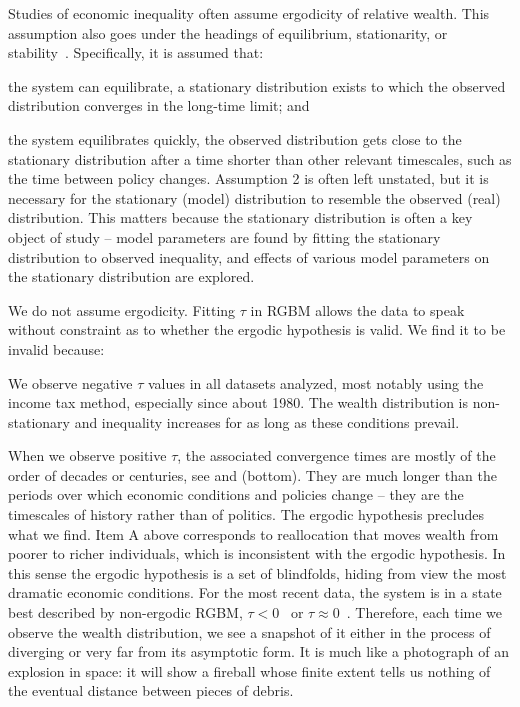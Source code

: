 Studies of economic inequality often assume ergodicity of relative wealth. This assumption also goes under the headings of equilibrium, stationarity, or stability~\cite{AdamouPeters2016}. Specifically, it is assumed that:
\bi
\item[1.] the system can equilibrate, \ie a stationary distribution exists to which the observed distribution converges in the long-time limit; and
\item[2.] the system equilibrates quickly, \ie the observed distribution gets close to the stationary distribution after a time shorter than other relevant timescales, such as the time between policy changes.
\ei
Assumption 2 is often left unstated, but it is necessary for the stationary (model) distribution to resemble the observed (real) distribution. This matters because the stationary distribution is often a key object of study -- model parameters are found by fitting the stationary distribution to observed inequality, and effects of various model parameters on the stationary distribution are explored.

We do not assume ergodicity. Fitting $\tau$ in RGBM allows the data to speak without constraint as to whether the ergodic hypothesis is valid. We find it to be invalid because:
\bi
\item[A.] We observe negative $\tau$ values in all datasets analyzed, most notably using the income tax method, especially since about 1980. The wealth distribution is non-stationary and inequality increases for as long as these conditions prevail.
\item[B.] When we observe positive $\tau$, the associated convergence times are mostly of the order of decades or centuries, see  and  (bottom). They are much longer than the periods over which economic conditions and policies change -- they are the timescales of history rather than of politics.
\ei
The ergodic hypothesis precludes what we find. Item A above corresponds to reallocation that moves wealth from poorer to richer individuals, which is inconsistent with the ergodic hypothesis. In this sense the ergodic hypothesis is a set of blindfolds, hiding from view the most dramatic economic conditions. For the most recent data, the system is in a state best described by non-ergodic RGBM, $\tau<0$~\cite{SaezZucman2014,WID2017} or $\tau \approx 0$~\cite{bricker2016measuring2}. Therefore, each time we observe the wealth distribution, we see a snapshot of it either in the process of diverging or very far from its asymptotic form. It is much like a photograph of an explosion in space: it will show a fireball whose finite extent tells us nothing of the eventual distance between pieces of debris.

